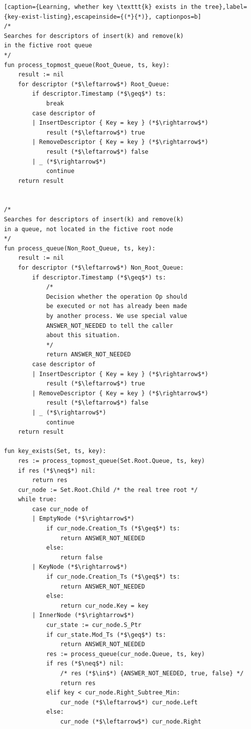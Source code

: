 \documentclass[times, dvipsnames,%
               languages={russian,english} %
              ]{itmo-student-thesis}
\begin{document}
\renewcommand{\lstlistingname}{Listing}
\begin{lstlisting}[caption={Learning, whether key \texttt{k} exists in the tree},label={key-exist-listing},escapeinside={(*}{*)}, captionpos=b]
/* 
Searches for descriptors of insert(k) and remove(k) 
in the fictive root queue
*/
fun process_topmost_queue(Root_Queue, ts, key):
    result := nil
    for descriptor (*$\leftarrow$*) Root_Queue:
        if descriptor.Timestamp (*$\geq$*) ts:
            break
        case descriptor of
        | InsertDescriptor { Key = key } (*$\rightarrow$*) 
            result (*$\leftarrow$*) true
        | RemoveDescriptor { Key = key } (*$\rightarrow$*) 
            result (*$\leftarrow$*) false
        | _ (*$\rightarrow$*) 
            continue
    return result


/* 
Searches for descriptors of insert(k) and remove(k) 
in a queue, not located in the fictive root node
*/
fun process_queue(Non_Root_Queue, ts, key):
    result := nil
    for descriptor (*$\leftarrow$*) Non_Root_Queue:
        if descriptor.Timestamp (*$\geq$*) ts:
            /*
            Decision whether the operation Op should
            be executed or not has already been made 
            by another process. We use special value
            ANSWER_NOT_NEEDED to tell the caller
            about this situation.
            */
            return ANSWER_NOT_NEEDED
        case descriptor of
        | InsertDescriptor { Key = key } (*$\rightarrow$*) 
            result (*$\leftarrow$*) true
        | RemoveDescriptor { Key = key } (*$\rightarrow$*) 
            result (*$\leftarrow$*) false
        | _ (*$\rightarrow$*) 
            continue
    return result
    
fun key_exists(Set, ts, key):
    res := process_topmost_queue(Set.Root.Queue, ts, key)
    if res (*$\neq$*) nil:
        return res
    cur_node := Set.Root.Child /* the real tree root */
    while true:
        case cur_node of
        | EmptyNode (*$\rightarrow$*)
            if cur_node.Creation_Ts (*$\geq$*) ts:
                return ANSWER_NOT_NEEDED
            else:
                return false
        | KeyNode (*$\rightarrow$*)
            if cur_node.Creation_Ts (*$\geq$*) ts:
                return ANSWER_NOT_NEEDED
            else:
                return cur_node.Key = key
        | InnerNode (*$\rightarrow$*)
            cur_state := cur_node.S_Ptr
            if cur_state.Mod_Ts (*$\geq$*) ts:
                return ANSWER_NOT_NEEDED
            res := process_queue(cur_node.Queue, ts, key)
            if res (*$\neq$*) nil:
                /* res (*$\in$*) {ANSWER_NOT_NEEDED, true, false} */
                return res
            elif key < cur_node.Right_Subtree_Min:
                cur_node (*$\leftarrow$*) cur_node.Left
            else:
                cur_node (*$\leftarrow$*) cur_node.Right
\end{lstlisting}
\end{document}
